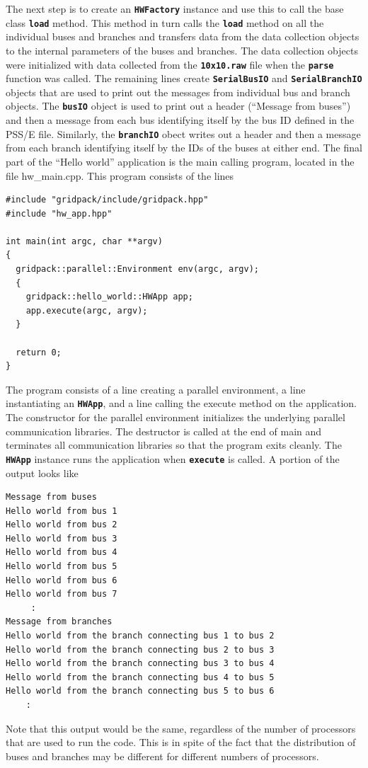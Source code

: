 The next step is to create an \texttt{\textbf{HWFactory}} instance and use this to call the base class \texttt{\textbf{load}} method. This method in turn calls the \texttt{\textbf{load}} method on all the individual buses and branches and transfers data from the data collection objects to the internal parameters of the buses and branches. The data collection objects were initialized with data collected from the \texttt{\textbf{10x10.raw}} file when the \texttt{\textbf{parse}} function was called. The remaining lines create \texttt{\textbf{SerialBusIO}} and \texttt{\textbf{SerialBranchIO}} objects that are used to print out the messages from individual bus and branch objects. The \texttt{\textbf{busIO}} object is used to print out a header (``Message from buses'') and then a message from each bus identifying itself by the bus ID defined in the PSS/E file. Similarly, the \texttt{\textbf{branchIO}} obect writes out a header and then a message from each branch identifying itself by the IDs of the buses at either end.
The final part of the ``Hello world'' application is the main calling program, located in the file hw\_main.cpp. This program consists of the lines

{
\color{red}
\begin{Verbatim}[fontseries=b]
#include "gridpack/include/gridpack.hpp"
#include "hw_app.hpp"

int main(int argc, char **argv)
{
  gridpack::parallel::Environment env(argc, argv);
  {
    gridpack::hello_world::HWApp app;
    app.execute(argc, argv);
  }

  return 0;
}
\end{Verbatim}
}

The program consists of a line creating a parallel environment, a line instantiating an \texttt{\textbf{HWApp}}, and a line calling the execute method on the application. The constructor for the parallel environment initializes the underlying parallel communication libraries. The destructor is called at the end of main and terminates all communication libraries so that the program exits cleanly. The \texttt{\textbf{HWApp}} instance runs the application when \texttt{\textbf{execute}} is called. A portion of the output looks like

{
\color{red}
\begin{Verbatim}[fontseries=b]
Message from buses
Hello world from bus 1
Hello world from bus 2
Hello world from bus 3
Hello world from bus 4
Hello world from bus 5
Hello world from bus 6
Hello world from bus 7
     :
Message from branches
Hello world from the branch connecting bus 1 to bus 2
Hello world from the branch connecting bus 2 to bus 3
Hello world from the branch connecting bus 3 to bus 4
Hello world from the branch connecting bus 4 to bus 5
Hello world from the branch connecting bus 5 to bus 6
    :
\end{Verbatim}
}

Note that this output would be the same, regardless of the number of processors that are used to run the code. This is in spite of the fact that the distribution of buses and branches may be different for different numbers of processors.
\newline
\hyperlink{topDoc}{\color{blue}{Top}}
